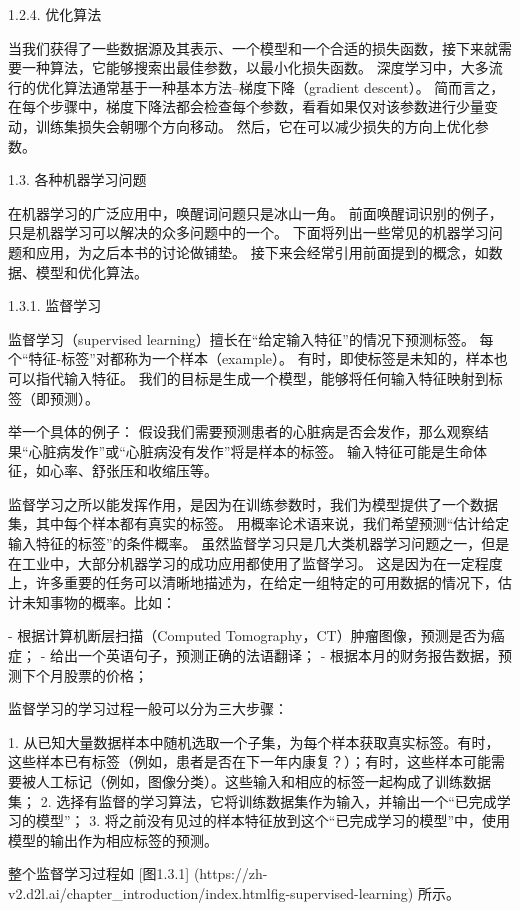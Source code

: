  1.2.4. 优化算法

当我们获得了一些数据源及其表示、一个模型和一个合适的损失函数，接下来就需要一种算法，它能够搜索出最佳参数，以最小化损失函数。 深度学习中，大多流行的优化算法通常基于一种基本方法–梯度下降（gradient descent）。 简而言之，在每个步骤中，梯度下降法都会检查每个参数，看看如果仅对该参数进行少量变动，训练集损失会朝哪个方向移动。 然后，它在可以减少损失的方向上优化参数。

 1.3. 各种机器学习问题

在机器学习的广泛应用中，唤醒词问题只是冰山一角。 前面唤醒词识别的例子，只是机器学习可以解决的众多问题中的一个。 下面将列出一些常见的机器学习问题和应用，为之后本书的讨论做铺垫。 接下来会经常引用前面提到的概念，如数据、模型和优化算法。

 1.3.1. 监督学习

监督学习（supervised learning）擅长在“给定输入特征”的情况下预测标签。 每个“特征-标签”对都称为一个样本（example）。 有时，即使标签是未知的，样本也可以指代输入特征。 我们的目标是生成一个模型，能够将任何输入特征映射到标签（即预测）。

举一个具体的例子： 假设我们需要预测患者的心脏病是否会发作，那么观察结果“心脏病发作”或“心脏病没有发作”将是样本的标签。 输入特征可能是生命体征，如心率、舒张压和收缩压等。

监督学习之所以能发挥作用，是因为在训练参数时，我们为模型提供了一个数据集，其中每个样本都有真实的标签。 用概率论术语来说，我们希望预测“估计给定输入特征的标签”的条件概率。 虽然监督学习只是几大类机器学习问题之一，但是在工业中，大部分机器学习的成功应用都使用了监督学习。 这是因为在一定程度上，许多重要的任务可以清晰地描述为，在给定一组特定的可用数据的情况下，估计未知事物的概率。比如：

- 根据计算机断层扫描（Computed Tomography，CT）肿瘤图像，预测是否为癌症；
- 给出一个英语句子，预测正确的法语翻译；
- 根据本月的财务报告数据，预测下个月股票的价格；

监督学习的学习过程一般可以分为三大步骤：

1. 从已知大量数据样本中随机选取一个子集，为每个样本获取真实标签。有时，这些样本已有标签（例如，患者是否在下一年内康复？）；有时，这些样本可能需要被人工标记（例如，图像分类）。这些输入和相应的标签一起构成了训练数据集；
2. 选择有监督的学习算法，它将训练数据集作为输入，并输出一个“已完成学习的模型”；
3. 将之前没有见过的样本特征放到这个“已完成学习的模型”中，使用模型的输出作为相应标签的预测。

整个监督学习过程如 [图1.3.1]
(https://zh-v2.d2l.ai/chapter\_introduction/index.htmlfig-supervised-learning) 
所示。

